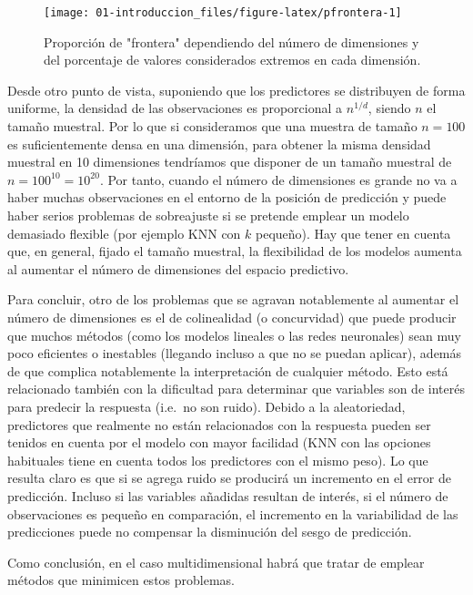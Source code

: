 \documentclass[
  spanish,
]{book}
\theoremstyle{break}
\theoremstyle{definition}
\theoremstyle{definition}
\theoremstyle{definition}
\theoremstyle{definition}
\theoremstyle{remark}
\begin{document}
\begin{figure}[!htb]

{\centering \texttt{[image: 01-introduccion\_files/figure-latex/pfrontera-1]} 

}

\caption{Proporción de "frontera" dependiendo del número de dimensiones y del porcentaje de valores considerados extremos en cada dimensión.}\label{fig:pfrontera}
\end{figure}

Desde otro punto de vista, suponiendo que los predictores se distribuyen de forma uniforme, la densidad de las observaciones es proporcional a \(n^{1/d}\), siendo \(n\) el tamaño muestral.
Por lo que si consideramos que una muestra de tamaño \(n=100\) es suficientemente densa en una dimensión, para obtener la misma densidad muestral en 10 dimensiones tendríamos que disponer de un tamaño muestral de \(n = 100^{10} = 10^{20}\).
Por tanto, cuando el número de dimensiones es grande no va a haber muchas observaciones en el entorno de la posición de predicción y puede haber serios problemas de sobreajuste si se pretende emplear un modelo demasiado flexible (por ejemplo KNN con \(k\) pequeño). Hay que tener en cuenta que, en general, fijado el tamaño muestral, la flexibilidad de los modelos aumenta al aumentar el número de dimensiones del espacio predictivo.

Para concluir, otro de los problemas que se agravan notablemente al aumentar el número de dimensiones es el de colinealidad (o concurvidad) que puede producir que muchos métodos (como los modelos lineales o las redes neuronales) sean muy poco eficientes o inestables (llegando incluso a que no se puedan aplicar), además de que complica notablemente la interpretación de cualquier método.
Esto está relacionado también con la dificultad para determinar que variables son de interés para predecir la respuesta (i.e.~no son ruido).
Debido a la aleatoriedad, predictores que realmente no están relacionados con la respuesta pueden ser tenidos en cuenta por el modelo con mayor facilidad (KNN con las opciones habituales tiene en cuenta todos los predictores con el mismo peso).
Lo que resulta claro es que si se agrega ruido se producirá un incremento en el error de predicción.
Incluso si las variables añadidas resultan de interés, si el número de observaciones es pequeño en comparación, el incremento en la variabilidad de las predicciones puede no compensar la disminución del sesgo de predicción.

Como conclusión, en el caso multidimensional habrá que tratar de emplear métodos que minimicen estos problemas.
\end{document}
